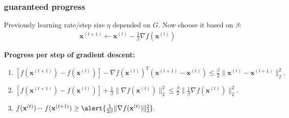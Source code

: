 \documentclass[compress]{beamer}
\newcommand{\bv}[1]{\mathbf{#1}}
\begin{document}
\begin{frame}[t]
	\frametitle{guaranteed progress}
	Previously learning rate/step size $\eta$ depended on $G$. Now choose it based on $\beta$:\vspace{-.75em}
	\begin{align*}
		\bv{x}^{(t+1)} \leftarrow \bv{x}^{(t)} - \frac{1}{\beta}\nabla f(\bv{x}^{(t)})
	\end{align*}
	
	\textbf{Progress per step of gradient descent:}
	\begin{enumerate}[1.]
		\item $\left[f(\bv{x}^{(t+1)}) - f(\bv{x}^{(t)})\right] - \nabla f(\bv{x}^{(t)})^T(\bv{x}^{(t+1)} - \bv{x}^{(t)})  \leq \frac{\beta}{2}\|\bv{x}^{(t)} - \bv{x}^{(t+1)}\|_2^2.$\vspace{3em}
		\item $\left[f(\bv{x}^{(t+1)}) - f(\bv{x}^{(t)})\right] + 
		\frac{1}{\beta}\|\nabla f(\bv{x}^{(t)})\|_2^2 \leq \frac{\beta}{2}\|\frac{1}{\beta}\nabla f(\bv{x}^{(t)})\|_2^2.$\vspace{3em}
		\item $f(\bv{x}^{(t)}) - f(\bv{x}^{(t+1)}) \geq \alert{\frac{1}{2\beta}\|\nabla f(\bv{x}^{(t)})\|_2^2}.$
	\end{enumerate}
\end{frame}

%	
%	
\end{document}
